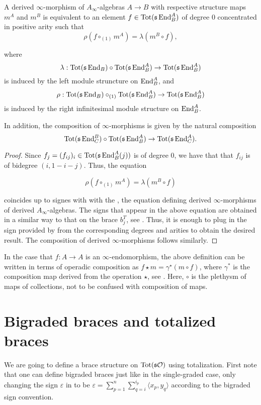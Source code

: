 \documentclass[Thesis.tex]{subfiles}
\begin{document}
\begin{lem}\label{dinfinitymorphism}
A derived $\infty$-morphism of $A_\infty$-algebras $A\to B$ with respective structure maps $m^A$ and $m^B$ is equivalent to an element $f\in\operatorname{Tot}(\mathfrak{s}\operatorname{End}^A_B)$ of degree 0 concentrated in positive arity such that \[\rho(f\circ_{(1)}m^A)=\lambda(m^B\circ f),\] 

where \[\lambda:\operatorname{Tot}(\mathfrak{s}\operatorname{End}_B)\circ \operatorname{Tot}(\mathfrak{s}\operatorname{End}^A_B)\to \operatorname{Tot}(\mathfrak{s}\operatorname{End}^A_B)\] is induced by the left module struncture on $\operatorname{End}^A_B$, and \[\rho:\operatorname{Tot}(\mathfrak{s}\operatorname{End}_B)\circ_{(1)}\operatorname{Tot}(\mathfrak{s}\operatorname{End}^A_B)\to \operatorname{Tot}(\mathfrak{s}\operatorname{End}^A_B)\] is induced by the right infinitesimal module structure on $\operatorname{End}^A_B$. 

In addition, the composition of $\infty$-morphisms is given by the natural composition \[\operatorname{Tot}(\mathfrak{s}\operatorname{End}^B_C)\circ \operatorname{Tot}(\mathfrak{s}\operatorname{End}^A_B)\to \operatorname{Tot}(\mathfrak{s}\operatorname{End}^A_C).\]
\end{lem}
\begin{proof}
Since $f_j=(f_{ij})_i\in\operatorname{Tot}(\mathfrak{s}\operatorname{End}^A_B(j))$ is of degree $0$, we have that that $f_{ij}$ is of bidegree $(i,1-i-j)$. Thus, the equation

\[\rho(f\circ_{(1)}m^A)=\lambda(m^B\circ f)\] 

coincides up to signes with with the , the equation defining derived $\infty$-morphisms of derived $A_\infty$-algebras. The signs that appear in the above equation are obtained in a similar way to that on the brace $b_j^T$, see . Thus, it is enough to plug in the sign provided by  from the corresponding degrees and arities to obtain the desired result. The composition of derived $\infty$-morphisms follows similarly.
\end{proof}

In the case that $f:A\to A$ is an $\infty$-endomorphism, the above definition can be written in terms of operadic composition as $f\star m=\gamma^\star(m\circ f)$, where $\gamma^*$ is the composition map derived from the operation $\star$, see . Here, $\circ$ is the plethysm of maps of collections, not to be confused with composition of maps. 


\section{Bigraded braces and totalized braces}\label{sectionbibraces}
We are going to define a brace structure on $\operatorname{Tot}(\mathfrak{s}{\mathcal O})$ using totalization. First note that one can define bigraded braces just like in the single-graded case, only changing the sign $\varepsilon$ in  to be $\varepsilon=\sum_{p=1}^n\sum_{q=i}^{i_p}\langle x_p,y_q\rangle$ according to the bigraded sign convention.
\end{document}
